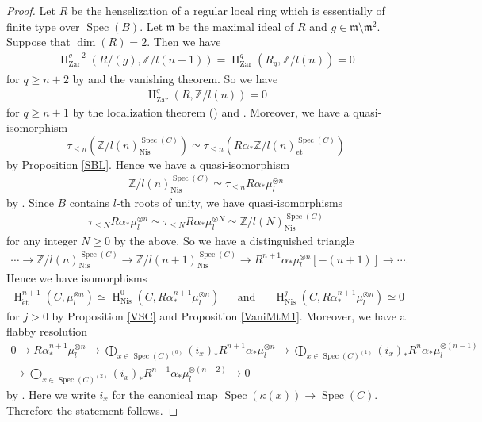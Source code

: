 \documentclass{article}
\newcommand{\spec}{\operatorname{Spec}}
\newcommand{\et}{\mathrm{\acute{e}t}}
\newcommand{\Nis}{\mathrm{Nis}}
\newcommand{\Zar}{\mathrm{Zar}}
\newcommand{\HO}{\operatorname{H}}
\begin{document}
%
\begin{proof}\upshape
Let $R$ be 
the henselization of a regular local ring 
which is essentially of finite type over $\spec(B)$. 
Let $\mathfrak{m}$ be the maximal ideal of $R$ and 
$g\in \mathfrak{m}\setminus\mathfrak{m}^{2}$.
Suppose that $\operatorname{dim}(R)=2$.
Then we have
%
\begin{align*}
\HO^{q-2}_{\Zar}(
R/(g), \mathbb{Z}/l(n-1)
)
=
\HO^{q}_{\Zar}(
R_{g}, \mathbb{Z}/l(n)
)
=0
\end{align*}
%
for $q\geq n+2$
by \cite[p.786, Corollary 4.4]{Ge} and the vanishing theorem.
So we have 
%
\begin{align*}
\HO^{q}_{\Zar}(
R, \mathbb{Z}/l(n)
) 
=0
\end{align*}
%
for $q\geq n+1$ by the localization theorem
(\cite[p.779, Theorem 3.2]{Ge}) and 
\cite[p.37, Corollary 7]{SM19}.
Moreover, we have a quasi-isomorphism
%
\begin{equation*}
\tau_{\leq n}
\left(
\mathbb{Z}/l(n)_{\Nis}^{\spec(C)}
\right)
\simeq
\tau_{\leq n}
\left(
R\alpha_{*}\mathbb{Z}/l(n)_{\et}^{\spec(C)}
\right)
\end{equation*}
by 
Proposition \ref{SBL}.
Hence we have
a quasi-isomorphism
%
\begin{align*}
\mathbb{Z}/l(n)_{\Nis}^{\spec(C)}
\simeq
\tau_{\leq n}
R\alpha_{*}\mu_{l}^{\otimes n}
\end{align*}
%
by \cite[Remark 4.7]{Sak4}. Since $B$ contains $l$-th roots of unity, 
we have quasi-isomorphisms
%
\begin{align*}
\tau_{\leq N}R\alpha_{*}\mu_{l}^{\otimes n}
\simeq 
\tau_{\leq N}R\alpha_{*}\mu_{l}^{\otimes N}
\simeq
\mathbb{Z}/l(N)_{\Nis}^{\spec(C)}
\end{align*}
%
for any integer $N\geq 0$ by the above. So we have a distinguished triangle
%
\begin{align*}
\cdots\to 
\mathbb{Z}/l(n)_{\Nis}^{\spec(C)}
\to
\mathbb{Z}/l(n+1)_{\Nis}^{\spec(C)}
\to
R^{n+1}\alpha_{*}\mu_{l}^{\otimes n}[-(n+1)]
\to 
\cdots.
\end{align*}
%
Hence we have
isomorphisms
%
\begin{align*}
\HO^{n+1}_{\et}(
C, \mu_{l}^{\otimes n}
)
\simeq
\HO^{0}_{\Nis}(
C, R\alpha_{*}^{n+1}
\mu_{l}^{\otimes n}
)
&&
\textrm{and}
&&
\HO_{\Nis}^{j}
(C,
R\alpha_{*}^{n+1}\mu_{l}^{\otimes n}
)
\simeq 0
\end{align*}
%
for $j>0$ by Proposition \ref{VSC} and Proposition \ref{VaniMtM1}.
Moreover, we have a flabby resolution 
%
\begin{align*}
0
\to
R\alpha_{*}^{n+1}\mu_{l}^{\otimes n}
\to
\displaystyle\bigoplus_{x\in \spec(C)^{(0)}}
(i_{x})_{*}R^{n+1}
\alpha_{*}\mu_{l}^{\otimes n}
\to
\displaystyle\bigoplus_{x\in \spec(C)^{(1)}}
(i_{x})_{*}R^{n}
\alpha_{*}\mu_{l}^{\otimes (n-1)}  \\
\to
\displaystyle\bigoplus_{x\in \spec(C)^{(2)}}
(i_{x})_{*}R^{n-1}
\alpha_{*}\mu_{l}^{\otimes (n-2)}
\to 0
\end{align*}
%
by 
\cite[p.38, Theorem 9]{SM19}.
Here
we write
$i_{x}$ 
for
the canonical map
$\spec(\kappa(x))\to \spec(C)$.
Therefore the statement follows.
\end{proof}
%
\end{document}

